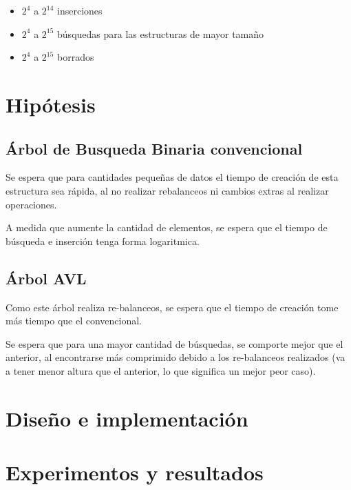 \documentclass[12pt,letterpaper,hidelinks]{extarticle}
\begin{document}
	\begin{itemize}
			\item $2^{4}$ a $2^{14}$ inserciones
			\item $2^{4}$ a $2^{15}$ búsquedas para las estructuras de mayor tamaño
			\item $2^{4}$ a $2^{15}$ borrados
	\end{itemize}

\newpage
\section{Hipótesis}

	\subsection{Árbol de Busqueda Binaria convencional}
		Se espera que para cantidades pequeñas de datos el tiempo de creación de esta estructura
		sea rápida, al no realizar rebalanceos ni cambios extras al realizar operaciones.

		A medida que aumente la cantidad de elementos, se espera que el tiempo de búsqueda e inserción
		tenga forma logaritmica.

	\subsection{Árbol AVL}
		Como este árbol realiza re-balanceos, se espera que el tiempo de creación tome más tiempo que el
		convencional.

		Se espera que para una mayor cantidad de búsquedas, se comporte mejor que el anterior, al encontrarse más comprimido
		 debido a los re-balanceos realizados (va a tener menor altura que el anterior, lo que significa un mejor peor caso).




\section{Diseño e implementación}

\section{Experimentos y resultados}
\end{document}
